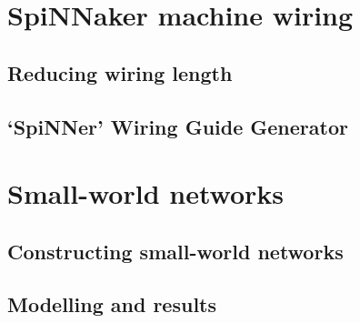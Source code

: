 	\section{SpiNNaker machine wiring}
		
		
		\subsection{Reducing wiring length}
			
		
		\subsection{`SpiNNer' Wiring Guide Generator}
			
	
	
	\section{Small-world networks}
		
		
		\subsection{Constructing small-world networks}
			
		
		\subsection{Modelling and results}
			
		
